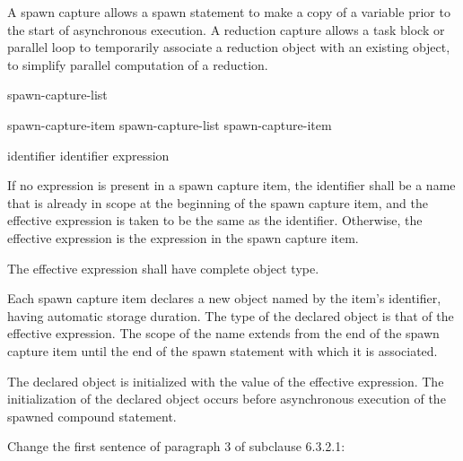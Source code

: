 

\pnum
A spawn capture allows a spawn statement
to make a copy of a variable
prior to the start of asynchronous execution.
A reduction capture allows a task block or parallel loop
to temporarily associate a reduction object
with an existing object,
to simplify parallel computation of a reduction.



\begin{bnf}
\br
{} \terminal{(} spawn-capture-list \terminal{)}
\end{bnf}

\begin{bnf}
\br
spawn-capture-item
\br
spawn-capture-list \terminal{,} spawn-capture-item
\end{bnf}

\begin{bnf}
\br
identifier
\br
identifier \terminal{=} expression
\end{bnf}


\pnum
If no expression is present in a spawn capture item,
the identifier shall be a name that is already in scope
at the beginning of the spawn capture item,
and the effective expression is taken to be the same as the identifier.
Otherwise, the effective expression
is the expression in the spawn capture item.

\pnum
The effective expression shall have complete object type.


\pnum
Each spawn capture item declares a new object
named by the item's identifier,
having automatic storage duration.
The type of the declared object is that of the effective expression.
The scope of the name extends from the end of the spawn capture item
until the end of the spawn statement with which it is associated.

\pnum
The declared object is initialized
with the value of the effective expression.
The initialization of the declared object
occurs before asynchronous execution
of the spawned compound statement.

\pnum
Change the first sentence of paragraph 3 of subclause 6.3.2.1:

